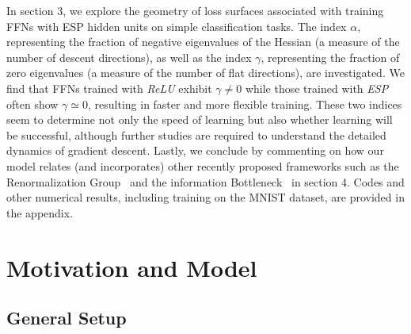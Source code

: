 \documentclass[5p]{elsarticle}
\begin{document}
In section 3, we explore the geometry of loss surfaces associated with training FFNs with ESP hidden units on simple classification tasks. The index $\alpha$, representing the fraction of negative eigenvalues of the Hessian (a measure of the number of descent directions), as well as the index $\gamma$, representing the fraction of zero eigenvalues (a measure of the number of flat directions), are investigated. We find that FFNs trained with {\it ReLU} exhibit $\gamma \neq 0$  while those trained with {\it ESP} often show $\gamma \simeq 0$, resulting in faster and more flexible training. These two indices seem to determine not only the speed of learning but also whether learning will be successful, although further studies are required to understand the detailed dynamics of gradient descent. Lastly, we conclude by commenting on how our model relates (and incorporates) other recently proposed frameworks such as the Renormalization Group~\cite{mehta} and the information Bottleneck~\cite{tishby1, tishby2} in section 4. Codes and other numerical results, including training on the MNIST dataset, are provided in the appendix.

%
\section{Motivation and Model} \label{sec:model}

\subsection{General Setup} \label{sub:setup}
\end{document}
